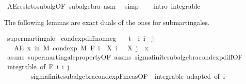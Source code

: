 \begin{isabellebody}
\ AE{\isacharunderscore}{\kern0pt}restr{\isacharunderscore}{\kern0pt}to{\isacharunderscore}{\kern0pt}subalg{\isacharbrackleft}{\kern0pt}OF\ subalgebra{\isacharbrackright}{\kern0pt}\ asm\ \isamarkupfalse%
\ simp\isanewline
\ \ \isacommand{{\isacharbraceright}{\kern0pt}}\isamarkupfalse%
\isanewline
{}\isamarkupfalse%
\ {\isacharparenleft}{\kern0pt}intro\ integrable{\isacharparenright}{\kern0pt}%
\endisatagproof
{\isafoldproof}%
%
\isadelimproof
%
\endisadelimproof
%
\isadelimdocument
%
\endisadelimdocument
%
\isatagdocument
%
\isamarkuptrue%
%
\endisatagdocument
{\isafolddocument}%
%
\isadelimdocument
%
\endisadelimdocument
%
\begin{isamarkuptext}%
The following lemmas are exact duals of the ones for submartingales.%
\end{isamarkuptext}\isamarkuptrue%
\isamarkupfalse%
\ supermartingale\isanewline
{}\isanewline
\isanewline
{}\isamarkupfalse%
\ cond{\isacharunderscore}{\kern0pt}exp{\isacharunderscore}{\kern0pt}diff{\isacharunderscore}{\kern0pt}nonneg{\isacharcolon}{\kern0pt}\isanewline
\ \ \ {\isachardoublequoteopen}t\ {\isasymle}\ i{\isachardoublequoteclose}\ {\isachardoublequoteopen}i\ {\isasymle}\ j{\isachardoublequoteclose}\isanewline
\ \ \ {\isachardoublequoteopen}AE\ x\ in\ M{\isachardot}{\kern0pt}\ cond{\isacharunderscore}{\kern0pt}exp\ M\ {\isacharparenleft}{\kern0pt}F\ i{\isacharparenright}{\kern0pt}\ {\isacharparenleft}{\kern0pt}{\isasymlambda}{\isasymxi}{\isachardot}{\kern0pt}\ X\ i\ {\isasymxi}\ {\isacharminus}{\kern0pt}\ X\ j\ {\isasymxi}{\isacharparenright}{\kern0pt}\ x\ {\isasymge}\ {}{\isachardoublequoteclose}\isanewline
%
\isadelimproof
\ \ %
\endisadelimproof
%
\isatagproof
{}\isamarkupfalse%
\ assms\ supermartingale{\isacharunderscore}{\kern0pt}property{\isacharbrackleft}{\kern0pt}OF\ assms{\isacharbrackright}{\kern0pt}\ sigma{\isacharunderscore}{\kern0pt}finite{\isacharunderscore}{\kern0pt}subalgebra{\isachardot}{\kern0pt}cond{\isacharunderscore}{\kern0pt}exp{\isacharunderscore}{\kern0pt}diff{\isacharbrackleft}{\kern0pt}OF\ {\isacharunderscore}{\kern0pt}\ integrable{\isacharparenleft}{\kern0pt}{}{\isacharcomma}{\kern0pt}{}{\isacharparenright}{\kern0pt}{\isacharcomma}{\kern0pt}\ of\ {\isachardoublequoteopen}F\ i{\isachardoublequoteclose}\ i\ j{\isacharbrackright}{\kern0pt}\ \isanewline
\ \ \ \ \ \ \ \ sigma{\isacharunderscore}{\kern0pt}finite{\isacharunderscore}{\kern0pt}subalgebra{\isachardot}{\kern0pt}cond{\isacharunderscore}{\kern0pt}exp{\isacharunderscore}{\kern0pt}F{\isacharunderscore}{\kern0pt}meas{\isacharbrackleft}{\kern0pt}OF\ {\isacharunderscore}{\kern0pt}\ integrable\ adapted{\isacharcomma}{\kern0pt}\ of\ i{\isacharbrackright}{\kern0pt}\ \isamarkupfalse%

\end{isabellebody}

